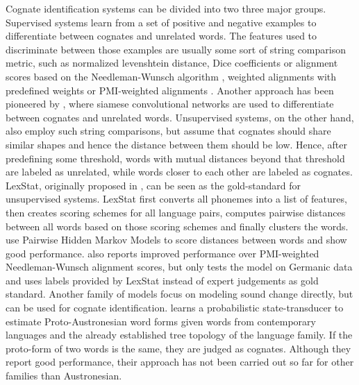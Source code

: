 \documentclass[6pt]{article}
\begin{document}
Cognate identification systems can be divided into two three major groups. Supervised systems learn from a set of positive and negative examples to differentiate between cognates and unrelated words. The features used to discriminate between those examples are usually some sort of  string comparison metric, such as normalized levenshtein distance, Dice coefficients or  alignment scores based on the Needleman-Wunsch algorithm  \citep{bergsma2007alignment,inkpen2005automatic}, weighted alignments with predefined weights \citep{kondrak2000new} or PMI-weighted alignments \citep{jager2014phylogenetic}. Another approach has been pioneered by \cite{rama2016siamese}, where siamese convolutional networks are used to differentiate between cognates and unrelated words. Unsupervised systems, on the other hand, also employ such string comparisons, but assume that cognates should share similar shapes and hence the distance between them should be low. Hence, after predefining some threshold, words with mutual distances beyond that threshold are labeled as unrelated, while words closer to each other are labeled as cognates.  LexStat, originally proposed in \cite{list2012lexstat}, can be seen as the gold-standard for unsupervised systems. LexStat first converts all phonemes into a list of features, then creates scoring schemes for all language pairs, computes pairwise distances between all words based on those scoring schemes and finally clusters the words. \cite{mackay2005computing,wahle2013alignment} use Pairwise Hidden Markov Models to score distances between words and show good performance.  \cite{wahle2013alignment} also reports improved performance over PMI-weighted Needleman-Wunsch alignment scores, but only tests the model on Germanic data and uses labels provided by LexStat instead of expert judgements as gold standard. Another family of models focus on modeling sound change directly, but can be used for cognate identification. \cite{bouchard2013automated} learns a probabilistic state-transducer to estimate Proto-Austronesian word forms given words from contemporary languages and the already established tree topology of the language family. If the proto-form of two words is the same, they are judged as cognates. Although they report good performance, their approach has not been carried out so far for other families than Austronesian.
\end{document}
